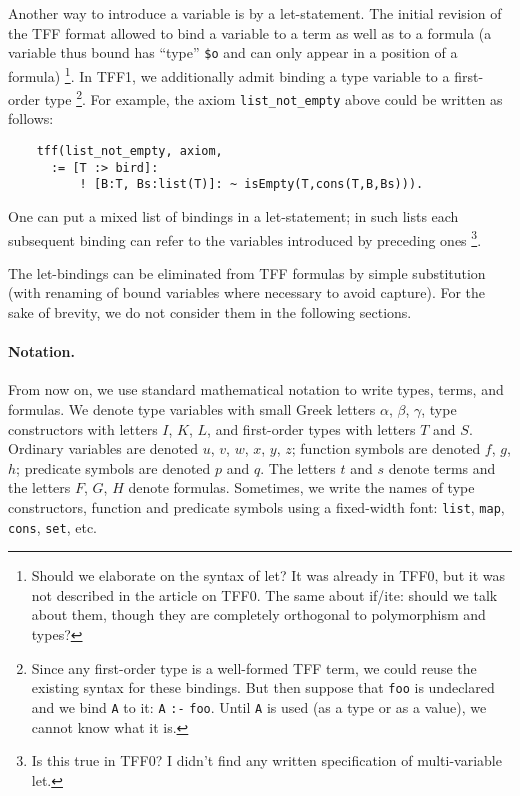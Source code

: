 Another way to introduce a variable is by a let-statement.
The initial revision of the TFF format allowed to bind a variable
to a term as well as to a formula (a variable thus bound has
``type'' \verb+$o+ and can only appear in a position of a formula)%
\footnote{Should we elaborate on the syntax of let?
It was already in TFF0, but it was not described in
the article on TFF0. The same about if/ite: should
we talk about them, though they are completely
orthogonal to polymorphism and types?}.
In TFF1, we additionally admit binding a type variable
to a first-order type%
\footnote{Since any first-order type is a well-formed TFF term,
we could reuse the existing syntax for these bindings.
But then suppose that {\tt foo} is undeclared and
we bind {\tt A} to it: {\tt A} {\tt :-} {\tt foo}.
Until {\tt A} is used
(as a type or as a value), we cannot know what it is.}.
For example,
the axiom \verb+list_not_empty+ above could be written as
follows:
\begin{verbatim}
    tff(list_not_empty, axiom,
      := [T :> bird]:
          ! [B:T, Bs:list(T)]: ~ isEmpty(T,cons(T,B,Bs))).
\end{verbatim}
One can put a mixed list of bindings in a let-statement;
in such lists each subsequent binding can refer
to the variables introduced by preceding ones%
\footnote{Is this true in TFF0? I didn't find any written
specification of multi-variable let.}.

The let-bindings can be eliminated from TFF formulas by simple
substitution (with renaming of bound variables where necessary
to avoid capture). For the sake of brevity, we do not consider
them in the following sections.

\paragraph{Notation.} From now on, we use standard
mathematical notation to write types, terms, and formulas.
We denote type variables with small Greek letters
$\alpha$, $\beta$, $\gamma$, type constructors
with letters $I$, $K$, $L$, and first-order
types with letters $T$ and $S$. Ordinary variables
are denoted $u$, $v$, $w$, $x$, $y$, $z$; function
symbols are denoted $f$, $g$, $h$; predicate symbols
are denoted $p$ and $q$. The letters $t$ and $s$ denote
terms and the letters $F$, $G$, $H$ denote formulas.
Sometimes, we write the names of type constructors,
function and predicate symbols using a fixed-width
font: {\tt list}, {\tt map}, {\tt cons}, {\tt set},
etc.


